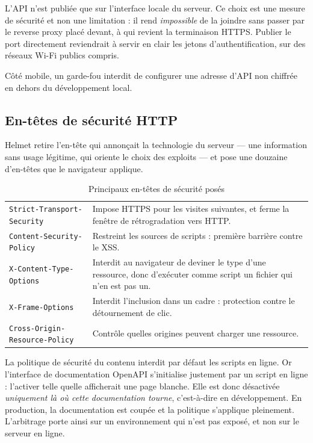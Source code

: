 L'API n'est publiée que sur l'interface locale du serveur. Ce choix est une
mesure de sécurité et non une limitation : il rend \emph{impossible} de la
joindre sans passer par le reverse proxy placé devant, à qui revient la
terminaison HTTPS. Publier le port directement reviendrait à servir en clair
les jetons d'authentification, sur des réseaux Wi-Fi publics compris.

Côté mobile, un garde-fou interdit de configurer une adresse d'API non
chiffrée en dehors du développement local.

\subsection{En-têtes de sécurité HTTP}

Helmet retire l'en-tête qui annonçait la technologie du serveur --- une
information sans usage légitime, qui oriente le choix des exploits --- et pose
une douzaine d'en-têtes que le navigateur applique.

\begin{table}[H]
\centering
\caption{Principaux en-têtes de sécurité posés}
\label{tab:entetes}
\begin{tabularx}{\textwidth}{L{6.3cm} X}
\toprule
{} &  \\
\midrule
\texttt{Strict-Transport-Security} & Impose HTTPS pour les visites suivantes,
et ferme la fenêtre de rétrogradation vers HTTP. \\
\texttt{Content-Security-Policy} & Restreint les sources de scripts : première
barrière contre le XSS. \\
\texttt{X-Content-Type-Options} & Interdit au navigateur de deviner le type
d'une ressource, donc d'exécuter comme script un fichier qui n'en est pas un. \\
\texttt{X-Frame-Options} & Interdit l'inclusion dans un cadre : protection
contre le détournement de clic. \\
\texttt{Cross-Origin-Resource-Policy} & Contrôle quelles origines peuvent
charger une ressource. \\
\bottomrule
\end{tabularx}
\end{table}

\begin{attention}
La politique de sécurité du contenu interdit par défaut les scripts en ligne.
Or l'interface de documentation OpenAPI s'initialise justement par un script en
ligne : l'activer telle quelle afficherait une page blanche. Elle est donc
désactivée \emph{uniquement là où cette documentation tourne}, c'est-à-dire en
développement. En production, la documentation est coupée et la politique
s'applique pleinement. L'arbitrage porte ainsi sur un environnement qui n'est
pas exposé, et non sur le serveur en ligne.
\end{attention}

